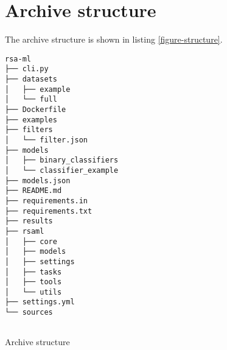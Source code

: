 \chapter{Archive structure}

The archive structure is shown in listing \ref{figure-structure}.

\begin{listing}[ht]
\begin{verbatim}
rsa-ml
├── cli.py
├── datasets
│   ├── example
│   └── full
├── Dockerfile
├── examples
├── filters
│   └── filter.json
├── models
│   ├── binary_classifiers
│   └── classifier_example
├── models.json
├── README.md
├── requirements.in
├── requirements.txt
├── results
├── rsaml
│   ├── core
│   ├── models
│   ├── settings
│   ├── tasks
│   ├── tools
│   └── utils
├── settings.yml
└── sources
    
\end{verbatim}
\caption{Archive structure}
\label{figure-structure}
\end{listing}

